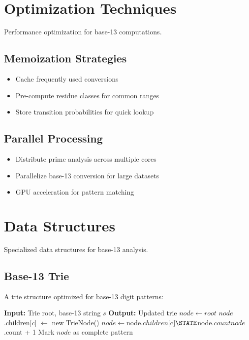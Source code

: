 \documentclass[12pt,a4paper]{report}
\begin{document}
\section{Optimization Techniques}

Performance optimization for base-13 computations.

\subsection{Memoization Strategies}

\begin{itemize}
\item Cache frequently used conversions
\item Pre-compute residue classes for common ranges
\item Store transition probabilities for quick lookup
\end{itemize}

\subsection{Parallel Processing}

\begin{itemize}
\item Distribute prime analysis across multiple cores
\item Parallelize base-13 conversion for large datasets
\item GPU acceleration for pattern matching
\end{itemize}

\section{Data Structures}

Specialized data structures for base-13 analysis.

\subsection{Base-13 Trie}

A trie structure optimized for base-13 digit patterns:

\begin{algorithm}[H]
\caption{Base-13 Trie Insertion}
\begin{algorithmic}[1]
\STATE \textbf{Input:} Trie root, base-13 string $s$
\STATE \textbf{Output:} Updated trie
\STATE $node \leftarrow root$
        \STATE $node$.children[$c$] $\leftarrow$ new TrieNode()
    \ENDIF
    \STATE $node \leftarrow $node$.children[$c$]
    \STATE $node$.count $\leftarrow $node$.count + 1
\ENDFOR
\STATE Mark $node$ as complete pattern
\end{algorithmic}
\end{algorithm}
\end{document}
